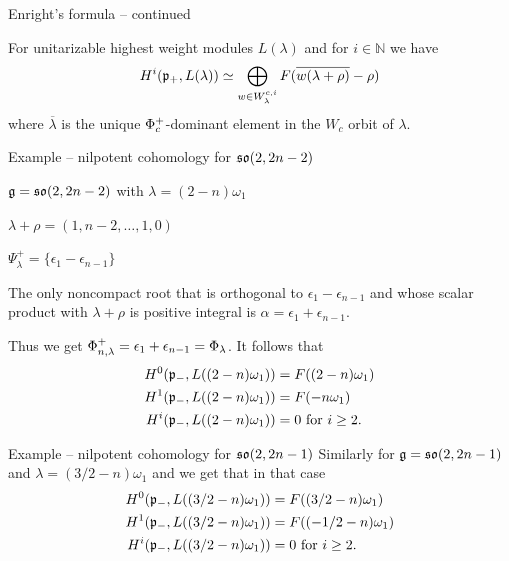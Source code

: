 \documentclass[10pt]{beamer}
\begin{document}
\begin{frame}{Enright's formula -- continued}
\begin{theorem}
 For unitarizable highest weight modules $L(\lambda)$ and for $i\in \mathbb{N}$ we have
\begin{equation*}
 H^i(\mathfrak{p}_+, L(\lambda))\simeq \bigoplus_{w\in W^{c,i}_\lambda} F(\overline{w(\lambda+\rho)} - \rho)
\end{equation*}
where  $\overline{\lambda}$ is the unique $\Phi_c^+$-dominant element in the $W_c$ orbit of $\lambda$.
\end{theorem}

\end{frame}


\begin{frame}{Example -- nilpotent cohomology for $ \mathfrak{so}(2,2n-2)$}

$\mathfrak{g} = \mathfrak{so}(2,2n-2)$ with $\lambda = (2-n)\omega_1$

$\lambda + \rho = (1,n-2,\ldots,1,0)$

 $\Psi_\lambda^+ = \{ \epsilon_1 - \epsilon_{n-1}\}$

The only noncompact root that is orthogonal to $\epsilon_1 -  \epsilon_{n-1}$ and whose scalar product with $\lambda + \rho$ is positive integral is $\alpha = \epsilon_1 + \epsilon_{n-1}$. 

Thus we get $\Phi_{n,\lambda}^+ = \epsilon_1 + \epsilon_{n-1} = \Phi_\lambda$. It follows that
\begin{align*}
 H^0(\mathfrak{p}_-,L((2-n)\omega_1)) &= F((2-n)\omega_1)\\
 H^1(\mathfrak{p}_-,L((2-n)\omega_1)) &= F(-n\omega_1)\\
 H^i(\mathfrak{p}_-,L((2-n)\omega_1)) &= 0 \text{ for } i\geq 2.
\end{align*} 
\end{frame}

\begin{frame}{Example -- nilpotent cohomology for $ \mathfrak{so}(2,2n-1)$}
Similarly for $\mathfrak{g} = \mathfrak{so}(2,2n-1)$ and $\lambda = (3/2 - n)\omega_1$ and we get that in that case
\begin{align*}
 H^0(\mathfrak{p}_-,L((3/2-n)\omega_1)) &= F((3/2-n)\omega_1)\\
 H^1(\mathfrak{p}_-,L((3/2-n)\omega_1)) &= F((-1/2-n)\omega_1)\\
 H^i(\mathfrak{p}_-,L((3/2-n)\omega_1)) &= 0 \text{ for } i\geq 2.
\end{align*}
\end{frame}
%
\end{document}
